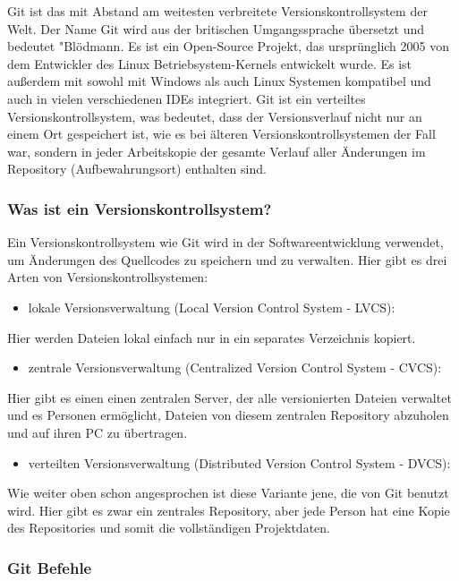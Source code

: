 Git ist das mit Abstand am weitesten verbreitete Versionskontrollsystem der Welt. Der Name Git wird aus der britischen 
Umgangssprache übersetzt und bedeutet "Blödmann.
\cite{sysarch-git-1}
Es ist ein Open-Source Projekt, 
das ursprünglich 2005 von dem Entwickler des Linux Betriebsystem-Kernels entwickelt wurde. Es ist außerdem mit sowohl mit 
Windows als auch Linux Systemen kompatibel und auch in vielen verschiedenen IDEs integriert. Git ist ein verteiltes Versionskontrollsystem, 
was bedeutet, dass der Versionsverlauf nicht nur an einem Ort gespeichert ist, wie es bei älteren Versionskontrollsystemen der Fall war, 
sondern in jeder Arbeitskopie der gesamte Verlauf aller Änderungen im Repository (Aufbewahrungsort) enthalten sind. 

\cite{sysarch-git-2}

\subsubsection{Was ist ein Versionskontrollsystem?}

Ein Versionskontrollsystem wie Git wird in der Softwareentwicklung verwendet, 
um Änderungen des Quellcodes zu speichern und zu verwalten. 
Hier gibt es drei Arten von Versionskontrollsystemen:
\cite{sysarch-git-2}
\begin{itemize}
 \item lokale Versionsverwaltung (Local Version Control System - LVCS): 
\end{itemize}
Hier werden Dateien lokal einfach nur in ein separates Verzeichnis kopiert.
\cite{sysarch-git-2}
\begin{itemize}
 \item zentrale Versionsverwaltung (Centralized Version Control System - CVCS):
\end{itemize}
Hier gibt es einen einen zentralen Server, der alle versionierten Dateien verwaltet und es Personen ermöglicht, 
Dateien von diesem zentralen Repository abzuholen und auf ihren PC zu übertragen.
\cite{sysarch-git-2}
\begin{itemize}
 \item verteilten Versionsverwaltung (Distributed Version Control System - DVCS):
\end{itemize}
Wie weiter oben schon angesprochen ist diese Variante jene, die von Git benutzt wird. Hier gibt es zwar ein zentrales Repository, 
aber jede Person  hat eine Kopie des Repositories und somit die vollständigen Projektdaten.
\cite{sysarch-git-2}

\subsubsection{Git Befehle}

